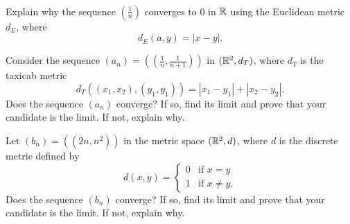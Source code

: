 \begin{pa} ~
\be
\item Explain why the sequence $\left(\frac{1}{n}\right)$ converges to 0 in $\mathbb{R}$ using the Euclidean metric $d_E$, where 
\[d_E(a,y) = | x-y |.\]

\item Consider the sequence $(a_n) = \left(\left(\frac{1}{n}, \frac{1}{n+1} \right)\right)$ in $(\mathbb{R}^2, d_T)$, where $d_T$ is the taxicab metric
\[d_T((x_1, x_2), (y_1, y_1)) = | x_1-y_1| + | x_2-y_2 |.\]
Does the sequence $(a_n)$ converge? If so, find its limit and prove that your candidate is the limit. If not, explain why.

\item Let $(b_n) = \left((2n, n^2)\right)$ in the metric space $(\mathbb{R}^2, d)$, where $d$ is the discrete metric defined by 
\[d(x,y) = \begin{cases} 0 &\text{if } x=y \\ 1 &\text{if } x \neq y. \end{cases}\]
Does the sequence $(b_n)$ converge? If so, find its limit and prove that your candidate is the limit. If not, explain why.

\ee

\end{pa}


